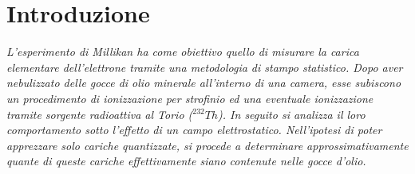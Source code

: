 \section{Introduzione}
\textit{L'esperimento di Millikan ha come obiettivo quello di misurare la carica elementare dell'elettrone tramite una metodologia di stampo statistico.
Dopo aver nebulizzato delle gocce di olio minerale all'interno di una camera, esse subiscono un procedimento di ionizzazione per strofinio ed una eventuale ionizzazione tramite sorgente radioattiva al Torio (\textit{$^{232}Th$}). In seguito si analizza il loro comportamento sotto l'effetto di un campo elettrostatico.
Nell'ipotesi di poter apprezzare solo cariche quantizzate, si procede a determinare approssimativamente quante di queste cariche effettivamente siano contenute nelle gocce d'olio.}